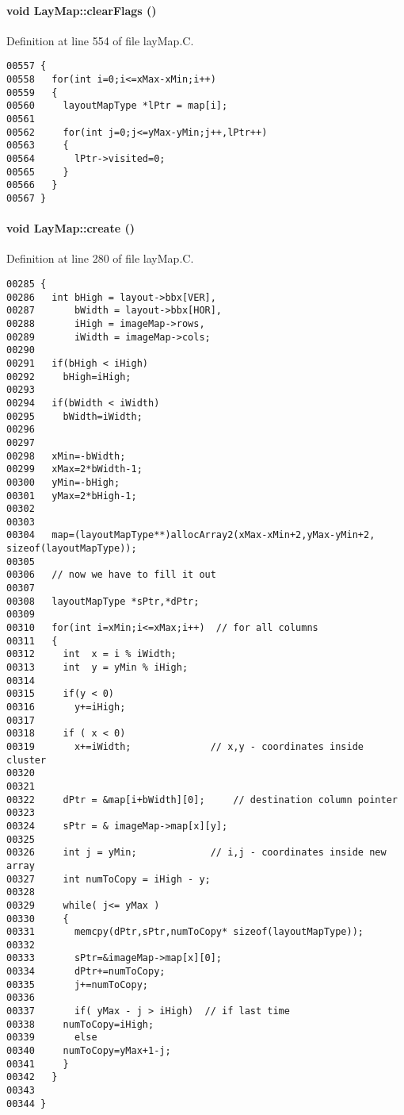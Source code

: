 \paragraph{\setlength{\rightskip}{0pt plus 5cm}void Lay\-Map::clear\-Flags ()\hspace{0.3cm}{\tt  [private]}}\hfill



Definition at line 554 of file lay\-Map.C.\small\begin{verbatim}00557 {
00558   for(int i=0;i<=xMax-xMin;i++)
00559   {
00560     layoutMapType *lPtr = map[i];
00561 
00562     for(int j=0;j<=yMax-yMin;j++,lPtr++)
00563     {
00564       lPtr->visited=0;
00565     }
00566   }
00567 }
\end{verbatim}\normalsize 
\label{LayMap_c1}
\paragraph{\setlength{\rightskip}{0pt plus 5cm}void Lay\-Map::create ()\hspace{0.3cm}{\tt  [private]}}\hfill



Definition at line 280 of file lay\-Map.C.\small\begin{verbatim}00285 {
00286   int bHigh = layout->bbx[VER],
00287       bWidth = layout->bbx[HOR],
00288       iHigh = imageMap->rows,
00289       iWidth = imageMap->cols;
00290 
00291   if(bHigh < iHigh)
00292     bHigh=iHigh;
00293 
00294   if(bWidth < iWidth)
00295     bWidth=iWidth;
00296 
00297 
00298   xMin=-bWidth;
00299   xMax=2*bWidth-1;
00300   yMin=-bHigh;
00301   yMax=2*bHigh-1;
00302 
00303 
00304   map=(layoutMapType**)allocArray2(xMax-xMin+2,yMax-yMin+2, sizeof(layoutMapType));
00305   
00306   // now we have to fill it out
00307 
00308   layoutMapType *sPtr,*dPtr;
00309   
00310   for(int i=xMin;i<=xMax;i++)  // for all columns
00311   {
00312     int  x = i % iWidth;
00313     int  y = yMin % iHigh;
00314 
00315     if(y < 0)
00316       y+=iHigh;
00317 
00318     if ( x < 0) 
00319       x+=iWidth;              // x,y - coordinates inside cluster
00320 
00321                      
00322     dPtr = &map[i+bWidth][0];     // destination column pointer
00323     
00324     sPtr = & imageMap->map[x][y];
00325 
00326     int j = yMin;             // i,j - coordinates inside new array
00327     int numToCopy = iHigh - y;
00328     
00329     while( j<= yMax )
00330     {
00331       memcpy(dPtr,sPtr,numToCopy* sizeof(layoutMapType));
00332       
00333       sPtr=&imageMap->map[x][0];
00334       dPtr+=numToCopy;
00335       j+=numToCopy;
00336 
00337       if( yMax - j > iHigh)  // if last time
00338     numToCopy=iHigh;
00339       else
00340     numToCopy=yMax+1-j;
00341     }
00342   }
00343 
00344 }
\end{verbatim}\normalsize 
\label{LayMap_a3}
